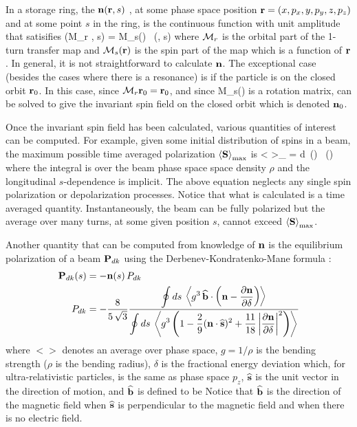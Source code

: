 {In a storage ring, the  ${\bf n}({\bf r}, s)$
\cite{b:spin.hoff,b:duan15}, at some phase space position ${\bf r} = (x, p_x, y, p_y, z, p_z)$ and at
some point $s$ in the ring, is the continuous function with unit amplitude that satisifies
\Begineq
  \bfn(\Cal M_r \bfr, s) = \Cal M_s(\bfr) \, \bfn(\bfr, s)
  \label{nmrs}
\Endeq
where ${\cal M}_r$ is the orbital part of the 1-turn transfer map and ${\cal M}_s({\bf r})$ is the spin
part of the map which is a function of ${\bf r}$. In general, it is not straightforward to calculate
${\bf n}$. The exceptional case (besides the cases where there is a resonance) is if the particle is on
the closed orbit ${\bf r}_0$. In this case, since ${\cal M}_r {\bf r}_0 = {\bf r}_0$, and since \Cal M_s(\bfr)
is a rotation matrix,  can be solved to give the invariant spin field on the closed orbit
which is denoted ${\bf n}_0$.

Once the invariant spin field has been calculated, various quantities of interest can be
computed. For example, given some initial distribution of spins in a beam, the maximum possible time
averaged polarization $\left< {\bf S} \right>_{\max}$ is
\Begineq
  \left< \bfS \right>_{\max} = \int d\bfr \, \rho(\bfr) \, \bfn(\bfr)
\Endeq
where the integral is over the beam phase space space density $\rho$ and the longitudinal
$s$-dependence is implicit. The above equation neglects any single spin polarization or
depolarization processes. Notice that what is calculated is a time averaged quantity.
Instantaneously, the beam can be fully polarized but the average over many turns, at some given
position $s$, cannot exceed $\left< {\bf S} \right>_{\max}$.

Another quantity that can be computed from knowledge of ${\bf n}$ is the equilibrium polarization of a beam
${\bf P}_{dk}$ using the Derbenev-Kondratenko-Mane formula \cite{b:barber}:
\begin{align}
  {\bf P}_{dk}(s) &= -{\bf n}(s) \, P_{dk} \\
  P_{dk} &= -\frac{8}{5 \, \sqrt{3}}
  \frac{\displaystyle \oint ds \,\left< g^3 \, \widehat{{\bf b}} \cdot 
    \left( {\bf n} - \frac{\partial {\bf n}}{\partial \delta} \right) \right>}
  {\displaystyle \oint ds \, \left< g^3 \left( 1 - \frac{2}{9} ({\bf n} \cdot \widehat{{\bf s}})^2 + 
    \frac{11}{18} \left| \frac{\partial {\bf n}}{\partial \delta} \right|^2 \right) \right>}
    \nonumber
\end{align}
where $<>$ denotes an average over phase space, $g = 1/\rho$ is the bending
strength ($\rho$ is the bending radius), $\delta$ is the fractional energy deviation which, for
ultra-relativistic particles, is the same as phase space $p_z$, $\widehat{{\bf s}}$ is the unit vector in
the direction of motion, and $\widehat{{\bf b}}$ is defined to be
\Begineq
  \what\bfb \equiv {}
\Endeq
Notice that $\widehat{{\bf b}}$ is the direction of the magnetic field when $\widehat{{\bf s}}$ is perpendicular to
the magnetic field and when there is no electric field.

}
